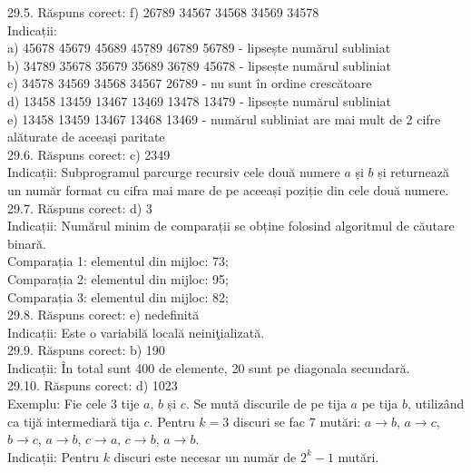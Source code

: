 29.5. Răspuns corect: f) 26789 34567 34568 34569 34578\\
Indicații:\\ a) 45678 45679 45689 $\underline{45789}$ 46789 56789 - lipsește numărul subliniat\\ b) 34789 35678 35679 35689 $\underline{36789}$ 45678 - lipsește numărul subliniat\\ c) 34578 34569 34568 34567 26789 - nu sunt în ordine crescătoare\\ d) 13458 13459 13467 $\underline{13469}$ 13478 13479 - lipsește numărul subliniat\\ e) 13458 13459 13467 13468 13469 - numărul subliniat are mai mult de 2 cifre alăturate de aceeași paritate\\

29.6. Răspuns corect: c) 2349\\
Indicații: Subprogramul parcurge recursiv cele două numere $a$ și $b$ și returnează un număr format cu cifra mai mare de pe aceeași poziție din cele două numere.\\

29.7. Răspuns corect: d) 3\\
Indicații: Numărul minim de comparații se obține folosind algoritmul de căutare binară.\\ Comparația 1: elementul din mijloc: 73;\\ Comparația 2: elementul din mijloc: 95;\\ Comparația 3: elementul din mijloc: 82;\\

29.8. Răspuns corect: e) nedefinită\\
Indicații: Este o variabilă locală neiniţializată.\\

29.9. Răspuns corect: b) 190\\
Indicații: În total sunt 400 de elemente, 20 sunt pe diagonala secundară.\\

29.10. Răspuns corect: d) 1023\\
Exemplu: Fie cele 3 tije $a$, $b$ și $c$. Se mută discurile de pe tija $a$ pe tija $b$, utilizând ca tijă intermediară tija $c$. Pentru $k=3$ discuri se fac 7 mutări: $a \rightarrow b$, $a \rightarrow c$, $b \rightarrow c$, $a \rightarrow b$, $c \rightarrow a$, $c \rightarrow b$, $a \rightarrow b$.\\ Indicații: Pentru $k$ discuri este necesar un număr de $2^{k}-1$ mutări.\\

